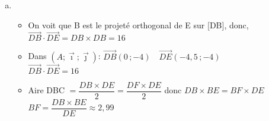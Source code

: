 \documentclass[12pt, a4paper]{article}
\let\oldsqrt\sqrt
\def\sqrt{\mathpalette\DHLhksqrt}
\def\DHLhksqrt#1#2{%
\setbox0=\hbox{$#1\oldsqrt{#2\,}$}\dimen0=\ht0
\advance\dimen0-0.2\ht0
\setbox2=\hbox{\vrule height\ht0 depth -\dimen0}%
{\box0\lower0.64pt\box2}}
\begin{document}
\begin{Exercise}[number={63}]
\begin{enumerate}[a)]
\begin{itemize}[leftmargin=3cm]
                        \item[Angle $\widehat{DEC}$:] $\overrightarrow{EC}\cdot\overrightarrow{ED}=EC\times ED\times\cos{\ \widehat{DEC}}$ \smallskip \\ $EC=\sqrt{x^{2}_{\overrightarrow{EC}}+y^{2}_{\overrightarrow{EC}}}=\sqrt{18{,}25}$ \\ $ED=\sqrt{x^{2}_{\overrightarrow{ED}}+y^{2}_{\overrightarrow{ED}}}=\sqrt{36{,}25}$ \smallskip \\ $cos{\ \widehat{DEC}}=\dfrac{\overrightarrow{EC}\cdot\overrightarrow{ED}}{EC\times ED}=\dfrac{9{,}25}{\sqrt{661{,}5625}}$ \medskip \\ $\widehat{DEC}=cos^{-1}{\left(\ \dfrac{9{,}25}{\sqrt{661{,}5625}}\right)\approx 68{,}92^{\circ}}$
                    \end{itemize} \bigbreak
        \item \begin{itemize}[leftmargin=3cm]
                        \item[Méthode 1:] On voit que B est le projeté orthogonal de E sur [DB], donc, \medskip \\ $\overrightarrow{DB}\cdot\overrightarrow{DE}=DB\times DB=16$ \bigbreak
                        \item[Méthode 2:] Dans $(A;\overrightarrow{\imath};\overrightarrow{\jmath})$: $\overrightarrow{DB}(0\,;-4) \quad \overrightarrow{DE}(-4{,}5\,;-4)$ \smallskip \\ $\overrightarrow{DB}\cdot\overrightarrow{DE}=16$ \bigbreak
                        \item[Longeur de BF:] Aire DBC $=\dfrac{DB\times DE}{2}=\dfrac{DF\times DE}{2}$ donc $DB\times BE=BF\times DE$ \medskip \\ $BF=\dfrac{DB\times BE}{DE}\approx2{,}99$
                    \end{itemize}
    \end{enumerate}  
\end{Exercise}

\pagebreak
\end{document}
